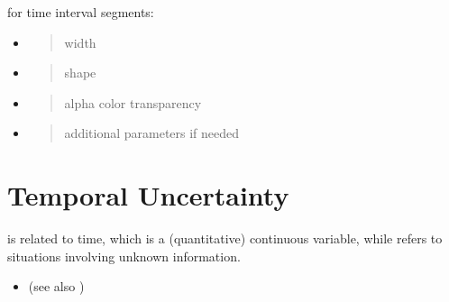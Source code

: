 \documentclass[a4paper,12pt,english]{sphinxhowto}
\begin{document}
for time interval segments:
\begin{itemize}
\item {} 
\begin{quote}

width
\end{quote}

\item {} 
\begin{quote}

shape
\end{quote}

\item {} 
\begin{quote}

alpha color transparency
\end{quote}

\item {} 
\begin{quote}

additional parameters if needed
\end{quote}

\end{itemize}

\begin{quote}




{\hyperref[\detokenize{Uncertainty:cprex}]{}}


\end{quote}



\section{Temporal Uncertainty}
\label{\detokenize{Uncertainty:temporal-uncertainty}}\label{\detokenize{Uncertainty:uncertainty}}\label{\detokenize{Uncertainty::doc}}
 is related to time, which is a (quantitative) continuous variable, while
 refers to situations involving unknown information.
\begin{itemize}
\item {} 
(see also {\hyperref[\detokenize{Time:time}]{}})

\end{itemize}
\end{document}
